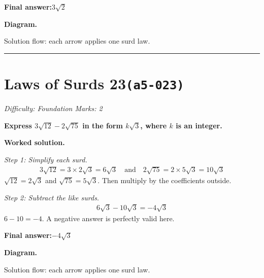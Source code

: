 \documentclass[11pt]{article}
\newcommand{\question}[1]{\par\medskip\noindent\textbf{#1}\par}
\begin{document}
\begin{answerbox}
\textbf{Final answer:}\quad \(\displaystyle 3\sqrt{2}\)
\end{answerbox}
\textbf{Diagram.}

\begin{center}
\end{center}
\small Solution flow: each arrow applies one surd law.\normalsize

\medskip\hrule

\section*{Laws of Surds 23\quad\small\texttt{(a5-023)}}
\textit{Difficulty: Foundation \quad\textbar\quad Marks: 2}

\question{Express \( 3\sqrt{12} - 2\sqrt{75} \) in the form \( k\sqrt{3} \), where \( k \) is an integer.}

\textbf{Worked solution.}

\textit{Step 1: Simplify each surd.}
\[\begin{gathered}
3\sqrt{12} = 3 \times 2\sqrt{3} = 6\sqrt{3} \quad \text{and} \quad 2\sqrt{75} = 2 \times 5\sqrt{3} = 10\sqrt{3}
\end{gathered}\]
\( \sqrt{12} = 2\sqrt{3} \) and \( \sqrt{75} = 5\sqrt{3} \). Then multiply by the coefficients outside.

\textit{Step 2: Subtract the like surds.}
\[\begin{gathered}
6\sqrt{3} - 10\sqrt{3} = -4\sqrt{3}
\end{gathered}\]
\( 6 - 10 = -4 \). A negative answer is perfectly valid here.

\begin{answerbox}
\textbf{Final answer:}\quad \(\displaystyle -4\sqrt{3}\)
\end{answerbox}
\textbf{Diagram.}

\begin{center}
\end{center}
\small Solution flow: each arrow applies one surd law.\normalsize
\end{document}
